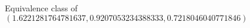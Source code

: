 \documentclass[preview]{standalone}
\begin{document}
\begin{center}
Equivalence class of $(1.6221281764781637, 0.9207053234388333, 0.7218046040771846)$
\end{center}
\end{document}
